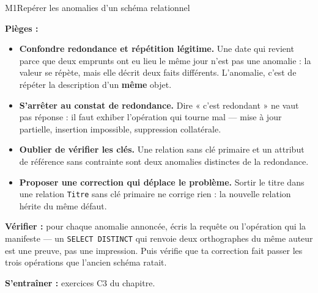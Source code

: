 \begin{fichemethode}{M1}{Repérer les anomalies d'un schéma relationnel}
%
%

\textbf{Pièges :}
\begin{itemize}
  \item \textbf{Confondre redondance et répétition légitime.} Une date qui revient parce que
    deux emprunts ont eu lieu le même jour n'est pas une anomalie : la valeur se répète, mais
    elle décrit deux faits différents. L'anomalie, c'est de répéter la description d'un
    \textbf{même} objet.
  \item \textbf{S'arrêter au constat de redondance.} Dire « c'est redondant » ne vaut pas
    réponse : il faut exhiber l'opération qui tourne mal — mise à jour partielle, insertion
    impossible, suppression collatérale.
  \item \textbf{Oublier de vérifier les clés.} Une relation sans clé primaire et un attribut
    de référence sans contrainte sont deux anomalies distinctes de la redondance.
  \item \textbf{Proposer une correction qui déplace le problème.} Sortir le titre dans une
    relation \texttt{Titre} sans clé primaire ne corrige rien : la nouvelle relation hérite du
    même défaut.
\end{itemize}

\textbf{Vérifier :} pour chaque anomalie annoncée, écris la requête ou l'opération qui la
manifeste — un \texttt{SELECT DISTINCT} qui renvoie deux orthographes du même auteur est une
preuve, pas une impression. Puis vérifie que ta correction fait passer les trois opérations
que l'ancien schéma ratait.

\textbf{S'entraîner :} exercices C3 du chapitre.
\end{fichemethode}
